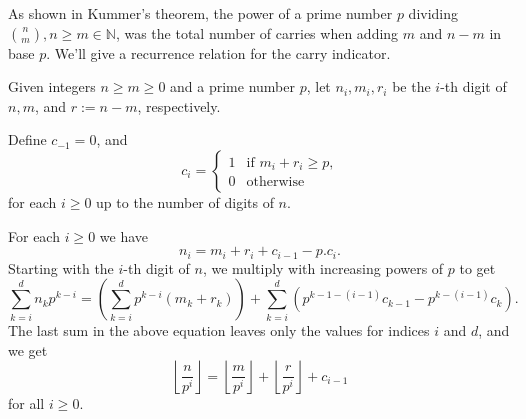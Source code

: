 \documentclass[12pt]{article}
\begin{document}
As shown in Kummer's theorem, the power of a prime number $p$ dividing
$\binom{n}{m}, n \ge m \in \mathbb{N}$, was the total number of carries when
adding $m$ and $n-m$ in base $p$. We'll give a recurrence relation for the carry
indicator.

Given integers $n \ge m \ge 0$ and a prime number $p$, let $n_i, m_i, r_i$ be
the $i$-th digit of $n,m$, and $r:=n-m$, respectively.

Define $c_{-1} =0$, and
\begin{displaymath}
c_i =\begin{cases}
1 & \text{if $m_i +r_i \ge p$,}\\
0 & \text{otherwise}
\end{cases}
\end{displaymath}
for each $i\ge 0$ up to the number of digits of $n$.

For each $i \ge 0$ we have
\begin{displaymath}
n_i =m_i +r_i +c_{i-1} -p.c_i.
\end{displaymath}
Starting with the $i$-th digit of $n$, we multiply with increasing powers of $p$
to get
\begin{displaymath}
\sum_{k=i}^d n_kp^{k-i} =\left(\sum_{k=i}^d p^{k-i}(m_k +r_k)\right)
+\sum_{k=i}^d \left(p^{k-1-(i-1)}c_{k-1} -p^{k-(i-1)}c_k\right).
\end{displaymath}
The last sum in the above equation leaves only the values for indices $i$ and
$d$, and we get
\begin{equation}
\label{L1}
\left\lfloor \frac{n}{p^i}\right\rfloor =\left\lfloor \frac{m}{p^i}\right\rfloor
+\left\lfloor \frac{r}{p^i}\right\rfloor +c_{i-1}
\end{equation}
for all $i \ge 0$.
\end{document}
